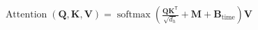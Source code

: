 \documentclass[border=3pt]{standalone}
\begin{document}
\color{ink}\fontsize{24}{32}\selectfont
$\displaystyle \operatorname{Attention}(\mathbf Q,\mathbf K,\mathbf V)=\operatorname{softmax}\!\left(\frac{\mathbf Q\mathbf K^{\mathsf T}}{\sqrt{d_h}}+\mathbf M+\mathbf B_{\mathrm{time}}\right)\mathbf V$
\end{document}
